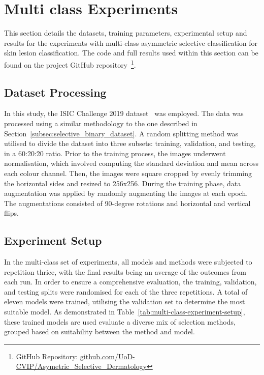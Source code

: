 \section{Multi class Experiments}
\label{sec:selective_multi_class_experiments}
This section details the datasets, training parameters, experimental setup and results for the experiments with multi-class asymmetric selective classification for skin lesion classification. The code and full results used within this section can be found on the project GitHub repository~\footnote{GitHub Repository: \url{github.com/UoD-CVIP/Asymetric_Selective_Dermatology}}.

\subsection{Dataset Processing}
In this study, the ISIC Challenge 2019 dataset~\citep{codella2018skin,combalia2019bcn20000,tschandl2018ham10000} was employed. The data was processed using a similar methodology to the one described in Section~\ref{subsec:selective_binary_dataset}. A random splitting method was utilised to divide the dataset into three subsets: training, validation, and testing, in a 60:20:20 ratio. Prior to the training process, the images underwent normalisation, which involved computing the standard deviation and mean across each colour channel. Then, the images were square cropped by evenly trimming the horizontal sides and resized to 256x256. During the training phase, data augmentation was applied by randomly augmenting the images at each epoch. The augmentations consisted of 90-degree rotations and horizontal and vertical flips.

\subsection{Experiment Setup}
In the multi-class set of experiments, all models and methods were subjected to repetition thrice, with the final results being an average of the outcomes from each run. In order to ensure a comprehensive evaluation, the training, validation, and testing splits were randomised for each of the three repetitions. A total of eleven models were trained, utilising the validation set to determine the most suitable model. As demonstrated in Table~\ref{tab:multi-class-experiment-setup}, these trained models are used evaluate a diverse mix of selection methods, grouped based on suitability between the method and model.

